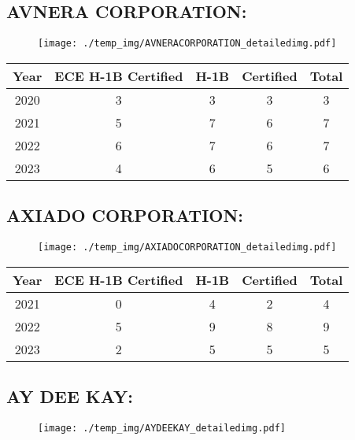 \documentclass{article}%
\begin{document}
%
\newpage%
\subsection{AVNERA CORPORATION:}%
\label{subsec:AVNERACORPORATION}%
\label{AVNERACORPORATIONdetailed}%


\begin{figure}[htbp]%
\centering%
\texttt{[image: ./temp\_img/AVNERACORPORATION\_detailedimg.pdf]}%
\end{figure}

%
\begin{longtable}{c|c|c|c|c}%
\hline%
Year&ECE H{-}1B Certified&H{-}1B&Certified&Total\\%
\hline%
2020&3&3&3&3\\%
\hline%
2021&5&7&6&7\\%
\hline%
2022&6&7&6&7\\%
\hline%
2023&4&6&5&6\\%
\hline%
\end{longtable}

%
\newpage%
\subsection{AXIADO CORPORATION:}%
\label{subsec:AXIADOCORPORATION}%
\label{AXIADOCORPORATIONdetailed}%


\begin{figure}[htbp]%
\centering%
\texttt{[image: ./temp\_img/AXIADOCORPORATION\_detailedimg.pdf]}%
\end{figure}

%
\begin{longtable}{c|c|c|c|c}%
\hline%
Year&ECE H{-}1B Certified&H{-}1B&Certified&Total\\%
\hline%
2021&0&4&2&4\\%
\hline%
2022&5&9&8&9\\%
\hline%
2023&2&5&5&5\\%
\hline%
\end{longtable}

%
\newpage%
\subsection{AY DEE KAY:}%
\label{subsec:AYDEEKAY}%
\label{AYDEEKAYdetailed}%


\begin{figure}[htbp]%
\centering%
\texttt{[image: ./temp\_img/AYDEEKAY\_detailedimg.pdf]}%
\end{figure}
\end{document}
